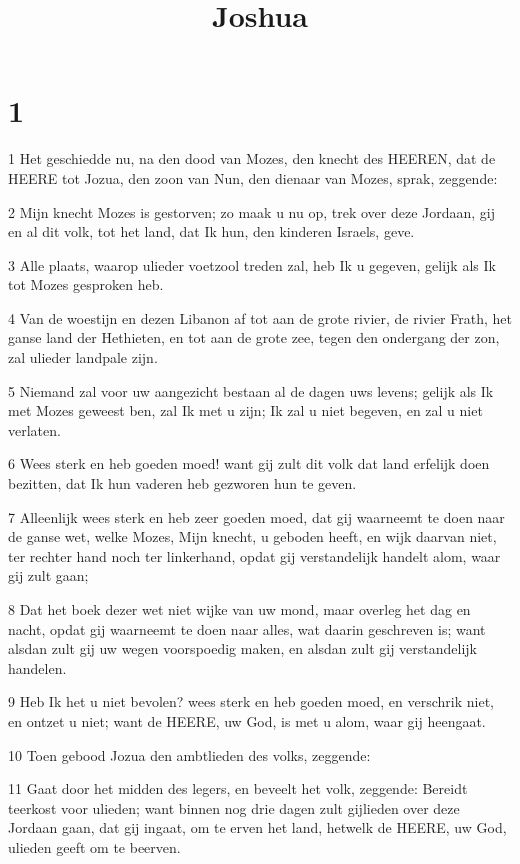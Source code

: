 

\title{Joshua}



\chapter{1}

\par 1 Het geschiedde nu, na den dood van Mozes, den knecht des HEEREN, dat de HEERE tot Jozua, den zoon van Nun, den dienaar van Mozes, sprak, zeggende:
\par 2 Mijn knecht Mozes is gestorven; zo maak u nu op, trek over deze Jordaan, gij en al dit volk, tot het land, dat Ik hun, den kinderen Israels, geve.
\par 3 Alle plaats, waarop ulieder voetzool treden zal, heb Ik u gegeven, gelijk als Ik tot Mozes gesproken heb.
\par 4 Van de woestijn en dezen Libanon af tot aan de grote rivier, de rivier Frath, het ganse land der Hethieten, en tot aan de grote zee, tegen den ondergang der zon, zal ulieder landpale zijn.
\par 5 Niemand zal voor uw aangezicht bestaan al de dagen uws levens; gelijk als Ik met Mozes geweest ben, zal Ik met u zijn; Ik zal u niet begeven, en zal u niet verlaten.
\par 6 Wees sterk en heb goeden moed! want gij zult dit volk dat land erfelijk doen bezitten, dat Ik hun vaderen heb gezworen hun te geven.
\par 7 Alleenlijk wees sterk en heb zeer goeden moed, dat gij waarneemt te doen naar de ganse wet, welke Mozes, Mijn knecht, u geboden heeft, en wijk daarvan niet, ter rechter hand noch ter linkerhand, opdat gij verstandelijk handelt alom, waar gij zult gaan;
\par 8 Dat het boek dezer wet niet wijke van uw mond, maar overleg het dag en nacht, opdat gij waarneemt te doen naar alles, wat daarin geschreven is; want alsdan zult gij uw wegen voorspoedig maken, en alsdan zult gij verstandelijk handelen.
\par 9 Heb Ik het u niet bevolen? wees sterk en heb goeden moed, en verschrik niet, en ontzet u niet; want de HEERE, uw God, is met u alom, waar gij heengaat.
\par 10 Toen gebood Jozua den ambtlieden des volks, zeggende:
\par 11 Gaat door het midden des legers, en beveelt het volk, zeggende: Bereidt teerkost voor ulieden; want binnen nog drie dagen zult gijlieden over deze Jordaan gaan, dat gij ingaat, om te erven het land, hetwelk de HEERE, uw God, ulieden geeft om te beerven.
